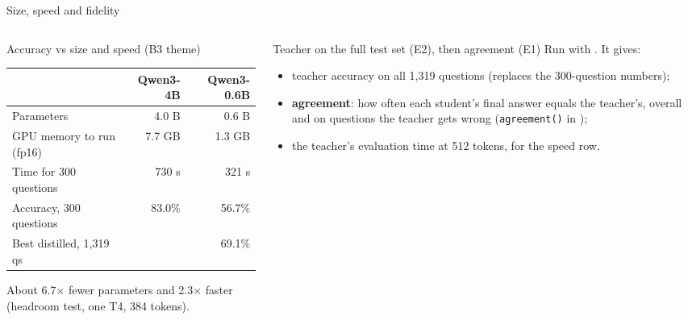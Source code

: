 \begin{frame}{Size, speed and fidelity\hfill\ours\ }
  \begin{columns}[T]
    \begin{column}{0.48\textwidth}
      \begin{block}{Accuracy vs size and speed (B3 theme)}
        \footnotesize
        \renewcommand{\arraystretch}{1.2}
        \begin{tabular}{@{}lrr@{}}
          & Qwen3-4B & Qwen3-0.6B \\
          \midrule
          Parameters & 4.0 B & 0.6 B \\
          GPU memory to run (fp16) & 7.7 GB & 1.3 GB \\
          Time for 300 questions & 730 s & 321 s \\
          Accuracy, 300 questions & 83.0\% & 56.7\% \\
          Best distilled, 1,319 qs & & 69.1\% \\
        \end{tabular}

        \vspace{0.1cm}
        \scriptsize About 6.7$\times$ fewer parameters and 2.3$\times$ faster
        (headroom test, one T4, 384 tokens).
      \end{block}
    \end{column}
    \begin{column}{0.48\textwidth}
      \begin{todobox}{Teacher on the full test set (E2), then agreement (E1)}
        Run  with . It gives:
        \begin{itemize}
          \item teacher accuracy on all 1,319 questions (replaces the 300-question numbers);
          \item \textbf{agreement}: how often each student's final answer equals the
                teacher's, overall and on questions the teacher gets wrong
                (\texttt{agreement()} in );
          \item the teacher's evaluation time at 512 tokens, for the speed row.
        \end{itemize}
      \end{todobox}
    \end{column}
  \end{columns}
\end{frame}
